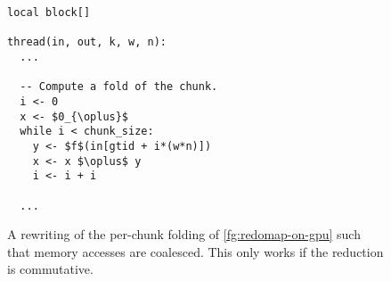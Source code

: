 \begin{figure}
\begin{lstlisting}[language={},mathescape]
local block[]

thread(in, out, k, w, n):
  ...

  -- Compute a fold of the chunk.
  i <- 0
  x <- $0_{\oplus}$
  while i < chunk_size:
    y <- $f$(in[gtid + i*(w*n)])
    x <- x $\oplus$ y
    i <- i + i

  ...
\end{lstlisting}

  \caption{A rewriting of the per-chunk folding of
    \cref{fg:redomap-on-gpu} such that memory accesses are coalesced.
    This only works if the reduction is commutative.}
  \label{fig:redomap-on-gpu-commutative}
\end{figure}


